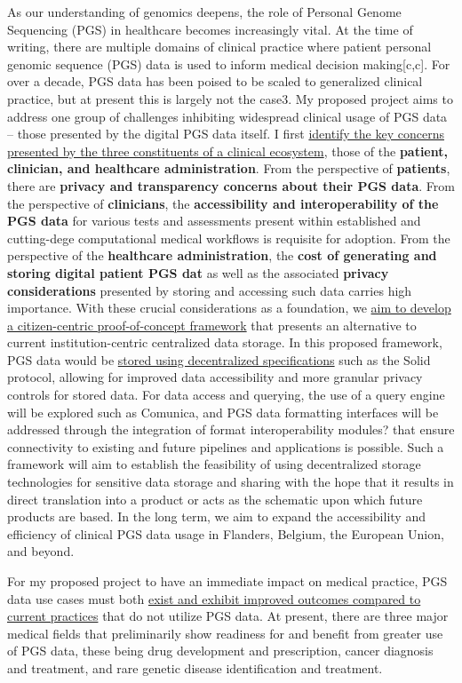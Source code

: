 \documentclass{article}
\begin{document}
As our understanding of genomics deepens, the role of Personal Genome Sequencing (PGS) in healthcare becomes increasingly vital. At the time of writing, there are multiple domains of clinical practice where patient personal genomic sequence (PGS) data is used to inform medical decision making[c,c]. For over a decade, PGS data has been poised to be scaled to generalized clinical practice, but at present this is largely not the case3. My proposed project aims to address one group of challenges inhibiting widespread clinical usage of PGS data -- those presented by the digital PGS data itself. I first \underline{identify the key concerns presented by the three constituents of a clinical ecosystem}, those of the \textbf{patient, clinician, and healthcare administration}. From the perspective of \textbf{patients}, there are \textbf{privacy and transparency concerns about their PGS data}. From the perspective of \textbf{clinicians}, the \textbf{accessibility and interoperability of the PGS data} for various tests and assessments present within established and cutting-dege computational medical workflows is requisite for adoption. From the perspective of the \textbf{healthcare administration}, the \textbf{cost of generating and storing digital patient PGS dat} as well as the associated \textbf{privacy considerations} presented by storing and accessing such data carries high importance. With these crucial considerations as a foundation, we \underline{aim to develop a citizen-centric proof-of-concept framework} that presents an alternative to current institution-centric centralized data storage. In this proposed framework, PGS data would be \underline{stored using decentralized specifications} such as the Solid protocol, allowing for improved data accessibility and more granular privacy controls for stored data. For data access and querying, the use of a query engine will be explored such as Comunica, and PGS data formatting interfaces will be addressed through the integration of format interoperability modules? that ensure connectivity to existing and future pipelines and applications is possible. Such a framework will aim to establish the feasibility of using decentralized storage technologies for sensitive data storage and sharing with the hope that it results in direct translation into a product or acts as the schematic upon which future products are based. In the long term, we aim to expand the accessibility and efficiency of clinical PGS data usage in Flanders, Belgium, the European Union, and beyond.

For my proposed project to have an immediate impact on medical practice, PGS data use cases must both \underline{exist and exhibit improved outcomes compared to current practices} that do not utilize PGS data. At present, there are three major medical fields that preliminarily show readiness for and benefit from greater use of PGS data, these being drug development and prescription, cancer diagnosis and treatment, and rare genetic disease identification and treatment.
\end{document}
